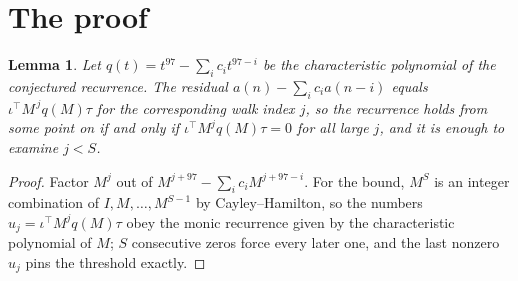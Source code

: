 \documentclass[11pt,a4paper]{article}
\theoremstyle{plain}
\newtheorem{lemma}[theorem]{Lemma}
\theoremstyle{definition}
\begin{document}
\section{The proof}

\begin{lemma}\label{lem:crit}
Let $q(t)=t^{97}-\sum_i c_it^{97-i}$ be the characteristic polynomial of the
conjectured recurrence. The residual $a(n)-\sum_ic_ia(n-i)$ equals
$\iota^{\!\top}M^{\,j}q(M)\tau$ for the corresponding walk index $j$, so the recurrence
holds from some point on if and only if $\iota^{\!\top}M^{j}q(M)\tau=0$ for all large $j$,
and it is enough to examine $j<S$.
\end{lemma}

\begin{proof}
Factor $M^{j}$ out of $M^{j+97}-\sum_ic_iM^{j+97-i}$. For the bound, $M^{S}$
is an integer combination of $I,M,\dots,M^{S-1}$ by Cayley--Hamilton, so the numbers
$u_j=\iota^{\!\top}M^{j}q(M)\tau$ obey the monic recurrence given by the characteristic
polynomial of $M$; $S$ consecutive zeros force every later one, and the last nonzero $u_j$
pins the threshold exactly.
\end{proof}
\end{document}
